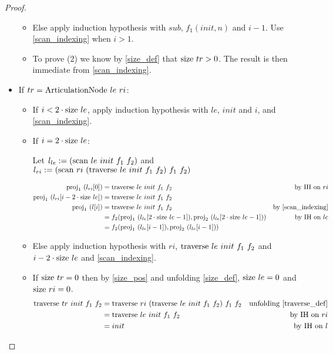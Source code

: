 \documentclass{article}
\newcommand{\textfun}[1]{\textup{#1}}
\newcommand{\fone}[2]{\ensuremath{f_{1}(#1, #2)}}
\newcommand{\ftwo}[2]{\ensuremath{f_{2}(#1, #2)}}
\newcommand{\artNode}[2]{\textfun{ArticulationNode}\ #1\ #2}
\newcommand{\longtraverse}[4]{\textfun{traverse}\ #1\ #2\ #3 \ #4}
\newcommand{\longscan}[4]{\textfun{scan}\ #1\ #2\ #3 \ #4}
\newcommand{\size}[1]{\textfun{size}\ #1}
\newcommand{\fst}[1]{\textfun{proj}_1\ #1}
\newcommand{\snd}[1]{\textfun{proj}_2\ #1}
\begin{document}
\begin{proof}
\begin{itemize}
\begin{itemize}
    \item Else apply induction hypothesis with $sub$, $\fone{init}{n}$ and $i - 1$. Use \cref{scan_indexing} when $i > 1$.
    \item To prove (2) we know by \cref{size_def} that $\size{tr} > 0$. The result is then immediate from \cref{scan_indexing}. 
    \end{itemize}
    \item If $tr = \artNode{le}{ri}$:
    \begin{itemize}
        \item If $i < 2 \cdot \size{le}$, apply induction hypothesis with $le$, $init$ and $i$, and \cref{scan_indexing}.
        \item If $i = 2 \cdot \size{le}$:
        
        Let $l_{le} := (\longscan{le}{init}{f_1}{f_2})$ and  $l_{ri} := (\longscan{ri}{(\longtraverse{le}{init}{f_1}{f_2})}{f_1}{f_2})$

            \begin{align*}
                \fst{(l_{ri}[0])} &= \longtraverse{le}{init}{f_1}{f_2}\: &\text{by IH on $ri$}\\
                \fst{(l_{ri}[i - 2 \cdot \size{le}])} &= \longtraverse{le}{init}{f_1}{f_2} \\
                \fst{(l[i])} &= \longtraverse{le}{init}{f_1}{f_2} &\text{by \cref{scan_indexing}} \\
                 &= \ftwo{\fst{(l_{le}[2 \cdot \size{le} - 1])}}{\snd{(l_{le}[2 \cdot \size{le} - 1])}} &\text{by IH on $le$} \\
                 &= \ftwo{\fst{(l_{le}[i - 1])}}{\snd{(l_{le}[i - 1])}}
            \end{align*}
        \item Else apply induction hypothesis with $ri$, $\longtraverse{le}{init}{f_1}{f_2}$ and $i - 2 \cdot \size{le}$ and \cref*{scan_indexing}.
        \item If $\size{tr} = 0$ then by \cref{size_pos} and unfolding \cref{size_def}, $\size{le} = 0$ and $\size{ri} = 0$.
                \begin{align*}
                    \longtraverse{tr}{init}{f_1}{f_2} &= \longtraverse{ri}{(\longtraverse{le}{init}{f_1}{f_2})}{f_1}{f_2} &\text{unfolding \cref{traverse_def}} \\
                    &= \longtraverse{le}{init}{f_1}{f_2} & \text{by IH on $ri$} \\
                    &= init & \text{by IH on $l$}
                \end{align*}


\end{itemize}
\end{itemize}
\end{proof}
\end{document}
